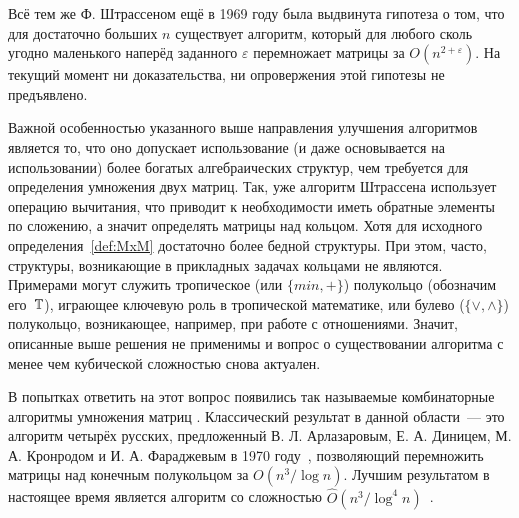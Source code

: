 Всё тем же Ф. Штрассеном ещё в 1969 году была выдвинута гипотеза о том, что для достаточно больших $n$ существует алгоритм, который для любого сколь угодно маленького наперёд заданного $\varepsilon$ перемножает матрицы за $O(n^{2+\varepsilon})$.
На текущий момент ни доказательства, ни опровержения этой гипотезы не предъявлено.

Важной особенностью указанного выше направления улучшения алгоритмов является то, что оно допускает использование (и даже основывается на использовании) более богатых алгебраических структур, чем требуется для определения умножения двух матриц.
Так, уже алгоритм Штрассена использует операцию вычитания, что приводит к необходимости иметь обратные элементы по сложению, а значит определять матрицы над кольцом.
Хотя для исходного определения~\ref{def:MxM} достаточно более бедной структуры.
При этом, часто, структуры, возникающие в прикладных задачах кольцами не являются.
Примерами могут служить тропическое (или $\{min, +\}$) полукольцо (обозначим его~$\mathbb{T}$), играющее ключевую роль в тропической математике, или булево ($\{\lor, \land\}$) полукольцо, возникающее, например, при работе с отношениями.
Значит, описанные выше решения не применимы и вопрос о существовании алгоритма с менее чем кубической сложностью снова актуален.

В попытках ответить на этот вопрос появились так называемые комбинаторные алгоритмы умножения матриц%
%
.
Классический результат в данной области~--- это алгоритм четырёх русских, предложенный В. Л. Арлазаровым, Е. А. Диницем, М. А. Кронродом и И. А. Фараджевым в 1970 году~\cite{ArlDinKro70}, позволяющий перемножить матрицы над конечным полукольцом за $O(n^3/\log n)$.
Лучшим результатом%
в настоящее время является алгоритм со сложностью%
 $\hat{O}(n^3/\log^4 n)$~\cite{10.1007/978-3-662-47672-7_89}.

